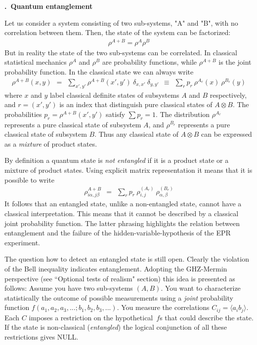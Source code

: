 \documentclass[onecolumn,fleqn, 11pt]{revtex4}
\newcommand{\beq}{\begin{eqnarray}}
\newcommand{\eeq}{\end{eqnarray}}
\renewcommand{\thesubsection}{\arabic{subsection}}
\renewcommand{\thesubsubsection}{\arabic{subsubsection}}
\newcommand{\sheadC}[1]
{
\addtocounter{subsubsection}{1}
\vspace{5mm}
{\bf \thesubsection.\thesubsubsection \ #1}  
\nopagebreak
\phantomsection
}
\begin{document}
\sheadC{Quantum entanglement}


Let us consider a system consisting of two sub-systems, 
"A" and "B", with no correlation between them. 
Then, the state of the system can be factorized: 
\beq
\rho^{A+B} = \rho^{A}\rho^{B} 
\eeq
But in reality the state of the two sub-systems 
can be correlated. In classical statistical 
mechanics  $\rho^{A}$ and $\rho^{B}$ are 
probability functions, while $\rho^{A+B}$ is the joint 
probability function. In the classical state 
we can always write 
\beq
\rho^{A+B}(x,y) 
\ \ = \ \ 
\sum_{x',y'} \rho^{A+B}(x',y') \ \delta_{x,x'} \ \delta_{y,y'} 
\ \ \equiv \ \ 
\sum_r p_r \ \rho^{A_r}(x) \ \rho^{B_r}(y) 
\eeq
where $x$ and $y$ label classical definite states 
of subsystems $A$ and $B$ respectively, 
and $r=(x',y')$ is an index that distinguish pure classical 
states of $A \otimes B$. 
The probabilities $p_r=\rho^{A+B}(x',y')$ satisfy $\sum p_r=1$. 
The distribution $\rho^{A_r}$ represents a pure classical state of subsystem $A$, 
and $\rho^{B_r}$ represents a pure classical state of subsystem $B$.
Thus any classical state of $A \otimes B$ can be expressed 
as a {\em mixture} of product states. 

By definition a quantum state is {\em not entangled} 
if it is a product state or a mixture of product states.
Using explicit matrix representation it means that 
it is possible to write 
\beq
\rho_{i\alpha,j\beta}^{A+B} \ \ = \ \ 
\sum_{r} p_{r} \ \rho_{i,j}^{(A_r)} \ \rho_{\alpha,\beta}^{(B_r)} 
\eeq
It follows that an entangled state, unlike a non-entangled state, cannot have a classical interpretation. 
This means that it cannot be described by a classical joint probability function. 
The latter phrasing highlights the relation between entanglement and 
the failure of the hidden-variable-hypothesis of the EPR experiment. 

The question how to detect an entangled state is still open.
Clearly the violation of the Bell inequality indicates entanglement.
Adopting the GHZ-Mermin perspective (see ``Optional tests of realism" section)   
this idea is presented as follows: Assume you have two sub-systems $(A,B)$.
You want to characterize statistically the outcome of 
possible measurements using a {\em joint} probability function ${f(a_1,a_2,a_3,...;b_1,b_2,b_3,...)}$. 
You measure the correlations ${C_{ij} = \langle a_i b_j \rangle}$. 
Each $C$ imposes a restriction on the hypothetical~$f$s that could describe the state.
If the state is non-classical ({\em entangled})
the logical conjunction of all these restrictions gives NULL. 
\end{document}
